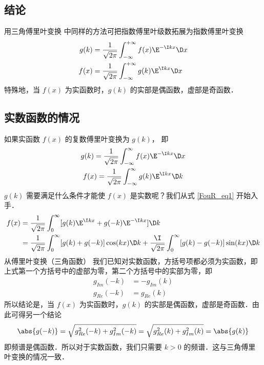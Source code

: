 

\subsection{结论}
用三角傅里叶变换  中同样的方法可把指数傅里叶级数拓展为指数傅里叶变换
\begin{align}
g(k) &= \frac{1}{\sqrt{2\pi}} \int_{-\infty}^{+\infty} f(x)\E^{-\I kx} \D x \\
f(x) &= \frac{1}{\sqrt{2\pi}} \int_{-\infty}^{+\infty} g(k)\E^{\I kx} \D x
\end{align}
特殊地，当 $f(x)$ 为实函数时，$g(k)$ 的实部是偶函数，虚部是奇函数．

\subsection{实数函数的情况}

如果实函数 $f(x)$ 的复数傅里叶变换为 $g(k)$， 即
\begin{gather}
g(k) = \frac{1}{\sqrt{2\pi}} \int_{-\infty}^\infty f(x)\E^{-\I kx} \D x\\
f(x) = \frac{1}{\sqrt{2\pi}} \int_{-\infty}^\infty g(k)\E^{\I kx} \D k \label{FouR_eq1}
\end{gather}
$g(k)$ 需要满足什么条件才能使 $f(x)$ 是实数呢？我们从式 \eqref{FouR_eq1} 开始入手．
\begin{equation}\begin{aligned}
f(x) &= \frac{1}{\sqrt{2\pi}} \int_0^\infty [g(k)\E^{\I kx} + g(-k)\E^{-\I kx}] \D k \\
&= \frac{1}{\sqrt{2\pi}} \int_0^\infty [g(k)+g(-k)]\cos(kx)\D k + \frac{\I}{\sqrt{2\pi}} \int_0^\infty [g(k)-g(-k)]\sin(kx) \D k
\end{aligned}\end{equation}
从傅里叶变换（三角函数）%
我们已知对实数函数，方括号项都必须为实函数，即上式第一个方括号中的虚部为零，第二个方括号中的实部为零，即
\begin{equation}\begin{aligned}
g_{Im}(-k) &= -g_{Im}(k) \\
g_{Re}(-k) &= g_{Re}(k)
\end{aligned}\end{equation}
所以结论是，当 $f(x)$ 为实函数时，$g(k)$ 的实部是偶函数，虚部是奇函数．由此可得另一个结论
\begin{equation}
\abs{g(-k)}=\sqrt{g_{Re}^2(-k)+g_{Im}^2(-k)}=\sqrt{g_{Re}^2(k)+g_{Im}^2(k)} = \abs{g(k)}
\end{equation}
即频谱是偶函数．所以对于实数函数，我们只需要 $k>0$ 的频谱．这与三角傅里叶变换的情况一致．